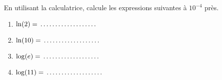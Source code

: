\documentclass[a4paper,12pt,singlepage]{report}
\newcommand{\jdot}[1]{ \makebox[#1]{\dotfill}}
\begin{document}
\begin{exercice}
En utilisant la calculatrice, calcule les expressions suivantes à \(10^{-4}\) près.

\par \setlength{\columnseprule}{0 pt}
          \begin{minipage}[t]{\linewidth}
          \begin{multicols}{2}
\begin{enumerate}
\item \(\ln(2)=\jdot{3cm}\)

\item \(\ln(10)=\jdot{3cm}\)

\item \(\log(e)=\jdot{3cm}\)

\item \(\log(11)=\jdot{3cm}\)
\end{enumerate}


\end{multicols}\end{minipage}
\end{exercice}
\end{document}
